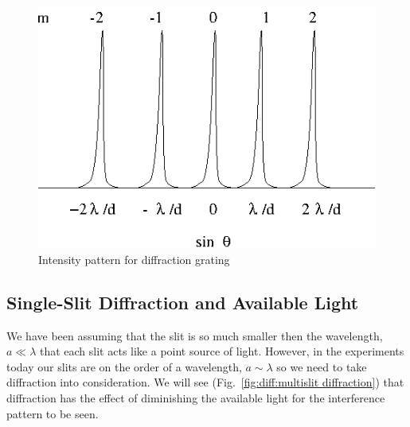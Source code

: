 \begin{figure}[htb]
\centering 
\epsfxsize=6cm \includegraphics[scale=1.0]{10_diffraction/diffractI.eps}
\caption{Intensity pattern for diffraction grating}
\label{fig:diff:diffgratI}
\end{figure}

\subsection{Single-Slit Diffraction and Available Light}
\label{sec:diff:singleslit}

We have been assuming that the slit is so much smaller then the wavelength,
$a \ll \lambda$ that each slit acts like a point source of light.  However,
in the experiments today our slits are on the order of a wavelength, 
$a \sim \lambda$ so we need to take diffraction into consideration.
We will see (Fig.~\ref{fig:diff:multislit diffraction}) that diffraction
has the effect of diminishing the available light for the interference pattern
to be seen.

